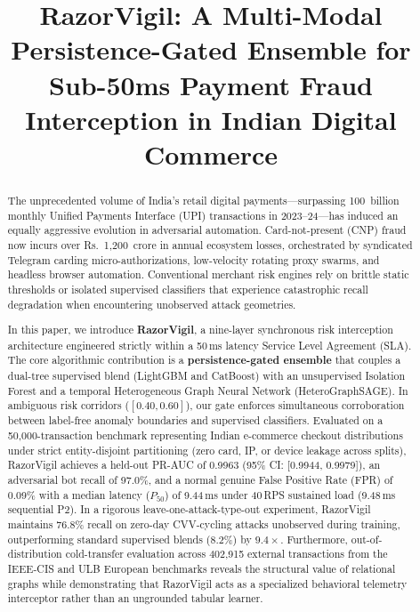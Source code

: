 \documentclass[conference]{IEEEtran}
\begin{document}
\title{RazorVigil: A Multi-Modal Persistence-Gated Ensemble for Sub-50ms Payment Fraud Interception in Indian Digital Commerce}

\author{%
}

\maketitle

\begin{abstract}
The unprecedented volume of India's retail digital payments---surpassing 100~billion monthly Unified Payments Interface (UPI) transactions in 2023--24---has induced an equally aggressive evolution in adversarial automation. Card-not-present (CNP) fraud now incurs over Rs.~1,200~crore in annual ecosystem losses, orchestrated by syndicated Telegram carding micro-authorizations, low-velocity rotating proxy swarms, and headless browser automation. Conventional merchant risk engines rely on brittle static thresholds or isolated supervised classifiers that experience catastrophic recall degradation when encountering unobserved attack geometries.

In this paper, we introduce \textbf{RazorVigil}, a nine-layer synchronous risk interception architecture engineered strictly within a 50\,ms latency Service Level Agreement (SLA). The core algorithmic contribution is a \textbf{persistence-gated ensemble} that couples a dual-tree supervised blend (LightGBM and CatBoost) with an unsupervised Isolation Forest and a temporal Heterogeneous Graph Neural Network (HeteroGraphSAGE). In ambiguous risk corridors ($[0.40, 0.60]$), our gate enforces simultaneous corroboration between label-free anomaly boundaries and supervised classifiers. Evaluated on a 50,000-transaction benchmark representing Indian e-commerce checkout distributions under strict entity-disjoint partitioning (zero card, IP, or device leakage across splits), RazorVigil achieves a held-out PR-AUC of 0.9963 (95\% CI: [0.9944, 0.9979]), an adversarial bot recall of 97.0\%, and a normal genuine False Positive Rate (FPR) of 0.09\% with a median latency ($P_{50}$) of 9.44\,ms under 40\,RPS sustained load (9.48\,ms sequential P2). In a rigorous leave-one-attack-type-out experiment, RazorVigil maintains 76.8\% recall on zero-day CVV-cycling attacks unobserved during training, outperforming standard supervised blends (8.2\%) by $9.4\times$. Furthermore, out-of-distribution cold-transfer evaluation across 402,915 external transactions from the IEEE-CIS and ULB European benchmarks reveals the structural value of relational graphs while demonstrating that RazorVigil acts as a specialized behavioral telemetry interceptor rather than an ungrounded tabular learner.
\end{abstract}
\end{document}
